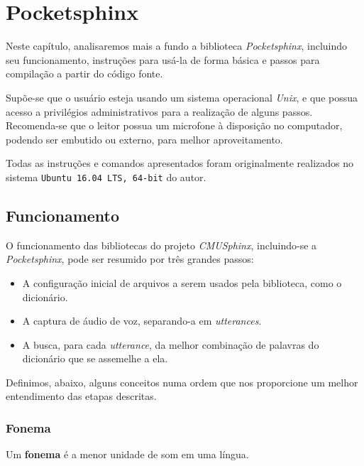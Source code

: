 \chapter{Pocketsphinx}
\label{cap:pocketsphinx}

Neste capítulo, analisaremos mais a fundo a biblioteca \textit{Pocketsphinx}, incluindo seu funcionamento, instruções para usá-la de forma básica e passos para compilação a partir do código fonte.

Supõe-se que o usuário esteja usando um sistema operacional \textit{Unix}, e que possua acesso a privilégios administrativos para a realização de alguns passos. Recomenda-se que o leitor possua um microfone à disposição no computador, podendo ser embutido ou externo, para melhor aproveitamento.

Todas as instruções e comandos apresentados foram originalmente realizados no sistema \texttt{Ubuntu 16.04 LTS, 64-bit} do autor.


\section{Funcionamento}

O funcionamento das bibliotecas do projeto \textit{CMUSphinx}, incluindo-se a \textit{Pocketsphinx}, pode ser resumido por três grandes passos:

\begin{itemize}
\item A configuração inicial de arquivos a serem usados pela biblioteca, como o dicionário.
\item A captura de áudio de voz, separando-a em \textit{utterances}.
\item A busca, para cada \textit{utterance}, da melhor combinação de palavras do dicionário que se assemelhe a ela.
\end{itemize}

Definimos, abaixo, alguns conceitos numa ordem que nos proporcione um melhor entendimento das etapas descritas.


\subsection{Fonema}

Um \textbf{fonema} é a menor unidade de som em uma língua.

